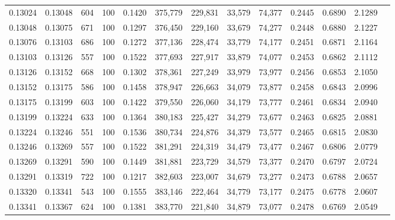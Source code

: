\begin{tabular}{rrrrrrrrrrrrr}
0.13024 & 0.13048 &   604 & 100 &                                     0.1420 & 375,779 & 229,831 &  33,579 &  74,377 & 0.2445 & 0.6890 & 2.1289 \\
0.13048 & 0.13075 &   671 & 100 &                                     0.1297 & 376,450 & 229,160 &  33,679 &  74,277 & 0.2448 & 0.6880 & 2.1227 \\
0.13076 & 0.13103 &   686 & 100 &                                     0.1272 & 377,136 & 228,474 &  33,779 &  74,177 & 0.2451 & 0.6871 & 2.1164 \\
0.13103 & 0.13126 &   557 & 100 &                                     0.1522 & 377,693 & 227,917 &  33,879 &  74,077 & 0.2453 & 0.6862 & 2.1112 \\
0.13126 & 0.13152 &   668 & 100 &                                     0.1302 & 378,361 & 227,249 &  33,979 &  73,977 & 0.2456 & 0.6853 & 2.1050 \\
0.13152 & 0.13175 &   586 & 100 &                                     0.1458 & 378,947 & 226,663 &  34,079 &  73,877 & 0.2458 & 0.6843 & 2.0996 \\
0.13175 & 0.13199 &   603 & 100 &                                     0.1422 & 379,550 & 226,060 &  34,179 &  73,777 & 0.2461 & 0.6834 & 2.0940 \\
0.13199 & 0.13224 &   633 & 100 &                                     0.1364 & 380,183 & 225,427 &  34,279 &  73,677 & 0.2463 & 0.6825 & 2.0881 \\
0.13224 & 0.13246 &   551 & 100 &                                     0.1536 & 380,734 & 224,876 &  34,379 &  73,577 & 0.2465 & 0.6815 & 2.0830 \\
0.13246 & 0.13269 &   557 & 100 &                                     0.1522 & 381,291 & 224,319 &  34,479 &  73,477 & 0.2467 & 0.6806 & 2.0779 \\
0.13269 & 0.13291 &   590 & 100 &                                     0.1449 & 381,881 & 223,729 &  34,579 &  73,377 & 0.2470 & 0.6797 & 2.0724 \\
0.13291 & 0.13319 &   722 & 100 &                                     0.1217 & 382,603 & 223,007 &  34,679 &  73,277 & 0.2473 & 0.6788 & 2.0657 \\
0.13320 & 0.13341 &   543 & 100 &                                     0.1555 & 383,146 & 222,464 &  34,779 &  73,177 & 0.2475 & 0.6778 & 2.0607 \\
0.13341 & 0.13367 &   624 & 100 &                                     0.1381 & 383,770 & 221,840 &  34,879 &  73,077 & 0.2478 & 0.6769 & 2.0549 \\

\end{tabular}
